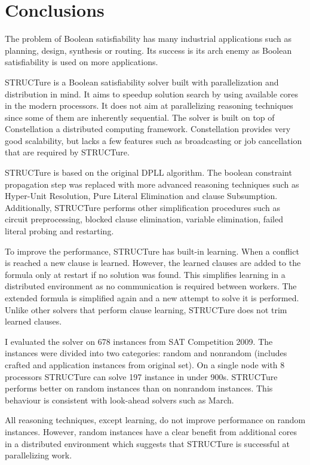 \chapter{Conclusions}
\label{chap:conclusions}

The problem of Boolean satisfiability has many industrial
applications such as planning, design, synthesis or routing. Its
success is its arch enemy as Boolean satisfiability is used on
more applications.

STRUCTure is a Boolean satisfiability solver built with
parallelization and distribution in mind. It aims to speedup solution
search by using available cores in the modern processors. It does not
aim at parallelizing reasoning techniques since some of them are
inherently sequential. The solver is built on top of Constellation
a distributed computing framework. Constellation provides very good
scalability, but lacks a few features such as broadcasting or job
cancellation that are required by STRUCTure.

STRUCTure is based on the original DPLL algorithm. The boolean
constraint propagation step was replaced with more advanced reasoning
techniques such as Hyper-Unit Resolution, Pure Literal Elimination
and clause Subsumption.  Additionally, STRUCTure performs other
simplification procedures such as circuit preprocessing, blocked
clause elimination, variable elimination, failed literal probing
and restarting.

To improve the performance, STRUCTure has built-in learning.  When a
conflict is reached a new clause is learned. However, the learned
clauses are added to the formula only at restart if no solution was
found. This simplifies learning in a distributed environment as no
communication is required between workers.  The extended formula is
simplified again and a new attempt to solve it is performed. Unlike
other solvers that perform clause learning, STRUCTure does not trim
learned clauses.

I evaluated the solver on 678 instances from SAT Competition 2009.
The instances were divided into two categories: random and nonrandom
(includes crafted and application instances from original set).
On a single node with 8 processors STRUCTure can solve 197 instance
in under 900s.  STRUCTure performs better on random instances than
on nonrandom instances. This behaviour is consistent with look-ahead
solvers such as March.

All reasoning techniques, except learning, do not improve performance
on random instances. However, random instances have a clear benefit
from additional cores in a distributed environment which suggests
that STRUCTure is successful at parallelizing work.

